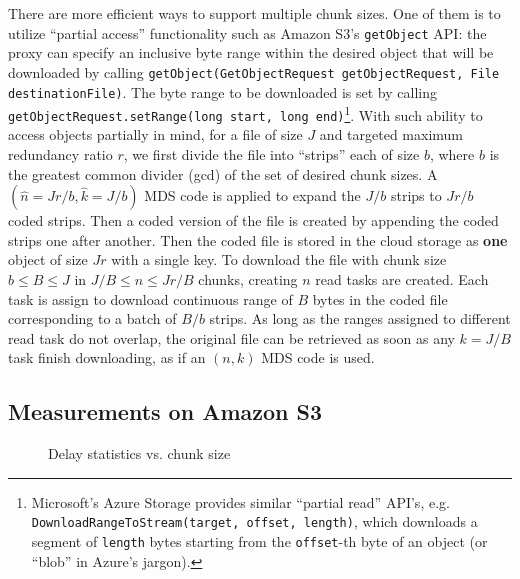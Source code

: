 \documentclass[journal]{IEEEtran}
\newcommand{\onewidth}{0.74\columnwidth}
\begin{document}
There are more efficient ways to support multiple chunk sizes. One of them is to 
 utilize ``partial access'' functionality such as Amazon S3's {\tt getObject} API: the proxy can specify an inclusive byte range within the desired object that will be downloaded by calling {\tt getObject(GetObjectRequest getObjectRequest, File destinationFile)}. The byte range to be downloaded is set by calling {\tt getObjectRequest.setRange(long start, long end)}\footnote{Microsoft's Azure Storage provides  similar ``partial read'' API's, e.g. {\tt DownloadRangeToStream(target, offset, length)}, which downloads a segment of {\tt length} bytes starting from the {\tt offset}-th byte of an object (or ``blob'' in Azure's jargon).}. With such ability to access objects partially in mind, for a file of size $J$ and targeted maximum redundancy ratio $r$, we first divide the file into ``strips'' each of size $b$, where $b$ is the greatest common divider (gcd) of the set of desired chunk sizes. A $(\hat{n}=Jr/b,\hat{k}=J/b)$ MDS code is applied to expand the $J/b$ strips to $Jr/b$ coded strips. Then a coded version of the file is created by appending the coded strips one after another. Then the coded file is stored in the cloud storage as {\bf one} object of size $Jr$ with a single key. 
To download the file with chunk size $b\le B\le J$ in $J/B \le n\le Jr/B$ chunks, creating $n$ read tasks are created. Each task is assign to download continuous range of $B$ bytes in the coded file corresponding to a batch of $B/b$ strips. As long as the ranges assigned to different read task do not overlap, the original file can be retrieved as soon as any $k=J/B$ task finish downloading, as if an $(n,k)$ MDS code is used. 

\fi

\subsection{Measurements on Amazon S3}
\label{ssec:measurement:S3}









\begin{figure*}[!t]
\centering
\null\hfill
	\hfill
\hfill\null
\caption{Delay statistics vs. chunk size}
\label{fig:delay-chunkSize}
\end{figure*}
\end{document}
